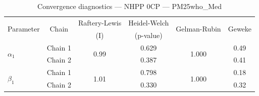 \begin{table}[H]
\centering
\caption{Convergence diagnostics — NHPP 0CP — PM25who_Med}
\begin{tabular}{lccccc}
\toprule
\multirow{2}{*}{Parameter} & \multirow{2}{*}{Chain} & Raftery-Lewis & Heidel-Welch & \multirow{2}{*}{Gelman-Rubin} & \multirow{2}{*}{Geweke} \\
 & & (I) & (p-value) & & (z) \\
\midrule
\multirow{2}{*}{$\alpha_1$} & Chain 1 & \multirow{2}{*}{0.99} & 0.629 & \multirow{2}{*}{1.000} & 0.49 \\
 & Chain 2 & & 0.387 & & 0.41 \\
\midrule
\multirow{2}{*}{$\beta_1$} & Chain 1 & \multirow{2}{*}{1.01} & 0.798 & \multirow{2}{*}{1.000} & 0.18 \\
 & Chain 2 & & 0.330 & & 0.32 \\
\bottomrule
\end{tabular}
\end{table}

